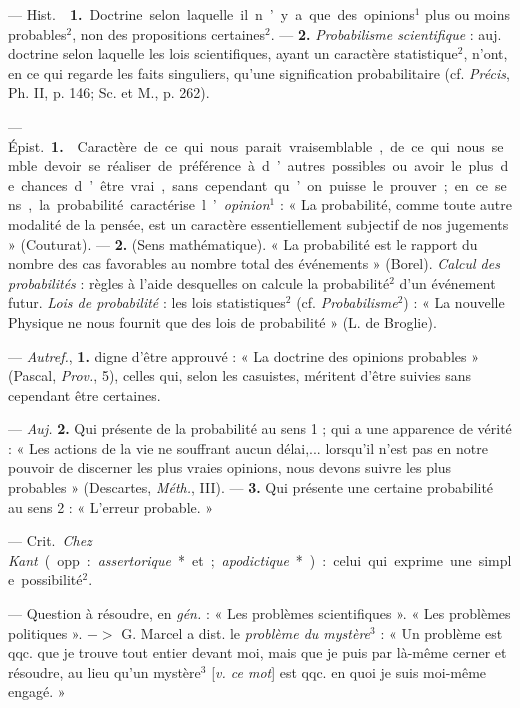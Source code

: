 \begin{itemize}[leftmargin=1cm, label=, itemsep=1pt]
 — \si{Hist.}  {\bf 1.} Doctrine selon laquelle il n’y a
que des opinions$^1$ plus ou moins probables$^2$, non des propositions
certaines$^2$. — {\bf 2.} {\it Probabilisme scientifique} : auj. doctrine
selon laquelle les lois scientifiques, ayant un caractère statistique$^2$,
n’ont, en ce qui regarde les faits singuliers, qu'une signification
probabilitaire (cf. {\it Précis}, Ph. II, p. 146; Sc. et M., p. 262).

 — \si{Épist.} {\bf 1.}  Caractère de ce qui
nous parait vraisemblable, de ce qui nous semble devoir se réaliser de
préférence à d’autres possibles ou avoir le plus de chances d’être vrai,
sans cependant qu’on puisse le prouver ; en ce sens, la probabilité
caractérise l’{\it opinion}$^1$ : « La probabilité, comme toute autre
modalité de la pensée, est un caractère essentiellement subjectif de nos
jugements » (Couturat). — {\bf 2.}  (Sens mathématique). « La
probabilité est le rapport du nombre des
cas favorables au nombre total des événements » (Borel). {\it Calcul des
probabilités} : règles à l'aide desquelles on calcule la probabilité$^2$
d’un événement futur. {\it Lois de probabilité} : les lois statistiques$^2$
(cf. {\it Probabilisme}$^2$) : « La nouvelle Physique ne nous fournit que
des lois de probabilité » (L. de Broglie).

 — {\it Autref.}, {\bf 1.} digne d'être approuvé : « La
doctrine des opinions probables » (Pascal, {\it Prov.}, 5), celles qui,
selon les casuistes, méritent d’être suivies sans cependant être certaines.

— {\it Auj.} {\bf 2.}  Qui présente de la probabilité au sens
1 ; qui a une apparence de vérité : « Les actions de la vie ne souffrant
aucun délai,... lorsqu'il n’est pas en notre pouvoir de discerner les plus
vraies opinions, nous devons suivre les plus probables » (Descartes,
{\it Méth.}, III). —  {\bf 3.}  Qui présente une certaine
probabilité au sens 2 : « L'erreur probable. »

 — \si{Crit.} {\it Chez Kant} (opp. :
{\it assertorique}* et ; {\it apodictique}*) : celui qui exprime une simple
possibilité$^2$.

 — Question à résoudre, en {\it gén.} : « Les problèmes
scientifiques ». « Les problèmes politiques ». $->$ G. Marcel a dist. le {\it
problème du mystère}$^3$ : « Un problème est qqc. que je trouve tout entier
devant moi, mais que je puis par là-même cerner et résoudre, au lieu qu’un
mystère$^3$ [{\it v. ce mot}] est qqc. en quoi je suis moi-même engagé. »


\end{itemize}
